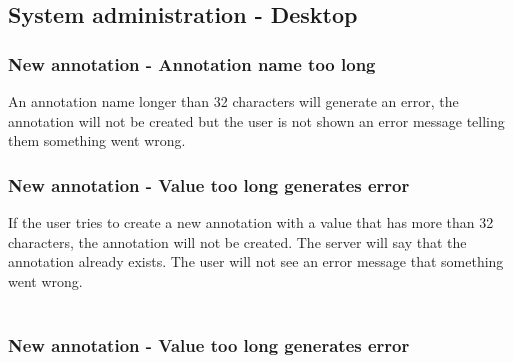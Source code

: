 \subsection{System administration - Desktop}

\subsubsection{New annotation - Annotation name too long}
An annotation name longer than 32 characters will generate an error,
the annotation will not be created but the user is not shown an
error message telling them something went wrong.

\subsubsection{New annotation - Value too long generates error}
If the user tries to create a new annotation with a value that has
more than 32 characters, the annotation will not be created. The
server will say that the annotation already exists. The user will not
see an error message that something went wrong. \\
\\
\subsubsection{New annotation - Value too long generates error}
